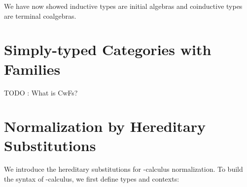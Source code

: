 We have now showed inductive types are initial algebras and coinductive types are terminal coalgebras.

\section{Simply-typed Categories with Families}

TODO : What is CwFs?

\section{Normalization by Hereditary Substitutions}

We introduce the hereditary substitutions for \lambda-calculus normalization. To build the syntax of \lambda-calculus, we first define types and contexts:

\begin{code}%
\>[0]\AgdaSpace{}%
\AgdaSpace{}%
\AgdaSymbol{:}\AgdaSpace{}%
\AgdaSpace{}%
\<%
\\
\>[0][@{}l@{\AgdaIndent{0}}]%
\>[2]\AgdaInductiveConstructor{*}%
\>[6]\AgdaSymbol{:}\AgdaSpace{}%
\<%
\\
%
\>[2]\AgdaSpace{}%
\AgdaSymbol{:}\AgdaSpace{}%
\AgdaSpace{}%
\AgdaSpace{}%
\AgdaSpace{}%
\AgdaSpace{}%
\<%
\\
%
\\[\AgdaEmptyExtraSkip]%
\>[0]\AgdaSpace{}%
\AgdaSpace{}%
\AgdaSymbol{:}\AgdaSpace{}%
\AgdaSpace{}%
\<%
\\
\>[0][@{}l@{\AgdaIndent{0}}]%
\>[2]%
\>[6]\AgdaSymbol{:}\AgdaSpace{}%
\<%
\\
%
\>[2]\AgdaSpace{}%
\AgdaSymbol{:}\AgdaSpace{}%
\AgdaSpace{}%
\AgdaSpace{}%
\AgdaSpace{}%
\AgdaSpace{}%
\<%
\end{code}

\begin{code}[hide]%
\>[0]\AgdaSpace{}%
\AgdaSpace{}%
\AgdaSpace{}%
\AgdaSpace{}%
\AgdaSymbol{:}\AgdaSpace{}%
\<%
\\
\>[0]\AgdaSpace{}%
\AgdaSpace{}%
\AgdaSpace{}%
\AgdaSymbol{:}\AgdaSpace{}%
\<%
\end{code}

